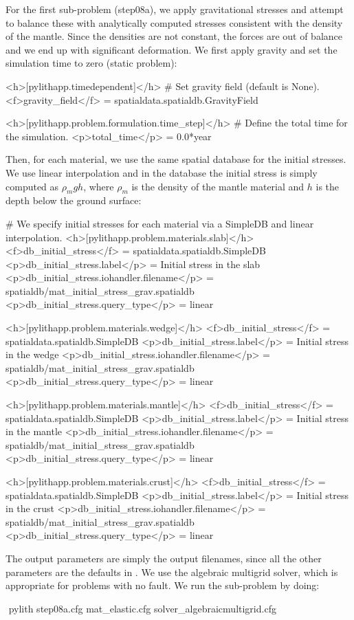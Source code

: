 For the first sub-problem (step08a), we apply gravitational stresses
and attempt to balance these with analytically computed stresses
consistent with the density of the mantle. Since the densities are not
constant, the forces are out of balance and we end up with significant
deformation. We first apply gravity and set the simulation time to
zero (static problem):
\begin{cfg}
<h>[pylithapp.timedependent]</h>
# Set gravity field (default is None).
<f>gravity_field</f> = spatialdata.spatialdb.GravityField

<h>[pylithapp.problem.formulation.time_step]</h>
# Define the total time for the simulation.
<p>total_time</p> = 0.0*year
\end{cfg}
Then, for each material, we use the same spatial database for the
initial stresses. We use linear interpolation and in the database the
initial stress is simply computed as $\rho_mgh$, where $\rho_m$ is
the density of the mantle material and $h$ is the depth below the
ground surface:
\begin{cfg}
# We specify initial stresses for each material via a SimpleDB and linear interpolation.
<h>[pylithapp.problem.materials.slab]</h>
<f>db_initial_stress</f> = spatialdata.spatialdb.SimpleDB
<p>db_initial_stress.label</p> = Initial stress in the slab
<p>db_initial_stress.iohandler.filename</p> = spatialdb/mat_initial_stress_grav.spatialdb
<p>db_initial_stress.query_type</p> = linear

<h>[pylithapp.problem.materials.wedge]</h>
<f>db_initial_stress</f> = spatialdata.spatialdb.SimpleDB
<p>db_initial_stress.label</p> = Initial stress in the wedge
<p>db_initial_stress.iohandler.filename</p> = spatialdb/mat_initial_stress_grav.spatialdb
<p>db_initial_stress.query_type</p> = linear

<h>[pylithapp.problem.materials.mantle]</h>
<f>db_initial_stress</f> = spatialdata.spatialdb.SimpleDB
<p>db_initial_stress.label</p> = Initial stress in the mantle
<p>db_initial_stress.iohandler.filename</p> = spatialdb/mat_initial_stress_grav.spatialdb
<p>db_initial_stress.query_type</p> = linear

<h>[pylithapp.problem.materials.crust]</h>
<f>db_initial_stress</f> = spatialdata.spatialdb.SimpleDB
<p>db_initial_stress.label</p> = Initial stress in the crust
<p>db_initial_stress.iohandler.filename</p> = spatialdb/mat_initial_stress_grav.spatialdb
<p>db_initial_stress.query_type</p> = linear
\end{cfg}

The output parameters are simply the output filenames, since all the
other parameters are the defaults in . We use
the algebraic multigrid solver, which is appropriate for problems with
no fault. We run the sub-problem by doing:
\begin{shell}
$$ pylith step08a.cfg mat_elastic.cfg solver_algebraicmultigrid.cfg
\end{shell}

